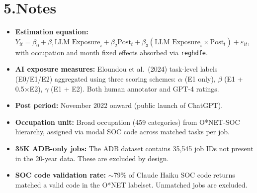 \documentclass[11pt]{article}
\begin{document}
\clearpage
\section*{5.\quad Notes}

\begin{itemize}
    \item \textbf{Estimation equation:} $Y_{it} = \beta_0 + \beta_1 \text{LLM\_Exposure}_i + \beta_2 \text{Post}_t + \beta_3 (\text{LLM\_Exposure}_i \times \text{Post}_t) + \varepsilon_{it}$, with occupation and month fixed effects absorbed via \texttt{reghdfe}.
    \item \textbf{AI exposure measures:} Eloundou et al.\ (2024) task-level labels (E0/E1/E2) aggregated using three scoring schemes: $\alpha$ (E1 only), $\beta$ (E1 + 0.5$\times$E2), $\gamma$ (E1 + E2). Both human annotator and GPT-4 ratings.
    \item \textbf{Post period:} November 2022 onward (public launch of ChatGPT).
    \item \textbf{Occupation unit:} Broad occupation (459 categories) from O*NET-SOC hierarchy, assigned via modal SOC code across matched tasks per job.
    \item \textbf{35K ADB-only jobs:} The ADB dataset contains 35,545 job IDs not present in the 20-year data. These are excluded by design.
    \item \textbf{SOC code validation rate:} $\sim$79\% of Claude Haiku SOC code returns matched a valid code in the O*NET labelset. Unmatched jobs are excluded.
\end{itemize}
\end{document}
